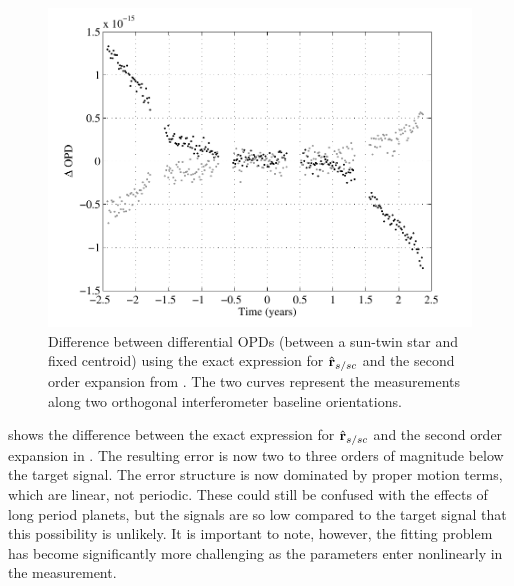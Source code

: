  \begin{figure}[ht]
\centering
\includegraphics[width=5.5in]{./figures/second_order_expansion}
 \caption[Second order expansion of astrometric observation equation]{ Difference between differential OPDs (between a sun-twin star and fixed centroid) using the exact expression for $\hat{\mathbf{r}}_{s/sc}$ and the second order expansion from . The two curves represent the measurements along two orthogonal interferometer baseline orientations. \label{fig:second_order_expansion}}
\end{figure} 
 shows the difference between the exact expression for $\hat{\mathbf{r}}_{s/sc}$ and the second order expansion in  .  The resulting error is now two to three orders of magnitude below the target signal.  The error structure is now dominated by proper motion terms, which are linear, not periodic.  These could still be confused with the effects of long period planets, but the signals are so low compared to the target signal that this possibility is unlikely.  It is important to note, however, the fitting problem has become significantly more challenging as the parameters enter nonlinearly in the measurement.

